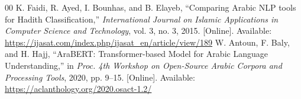 \documentclass[conference]{IEEEtran}
\begin{document}
\begin{thebibliography}{00}
 K. Faidi, R. Ayed, I. Bounhas, and B. Elayeb, ``Comparing Arabic NLP tools for Hadith Classification,'' \emph{International Journal on Islamic Applications in Computer Science and Technology}, vol. 3, no. 3, 2015. [Online]. Available: \url{https://ijasat.com/index.php/ijasat_en/article/view/189}
 W. Antoun, F. Baly, and H. Hajj, ``AraBERT: Transformer-based Model for Arabic Language Understanding,'' in \emph{Proc. 4th Workshop on Open-Source Arabic Corpora and Processing Tools}, 2020, pp. 9--15. [Online]. Available: \url{https://aclanthology.org/2020.osact-1.2/}
\end{thebibliography}
\end{document}
